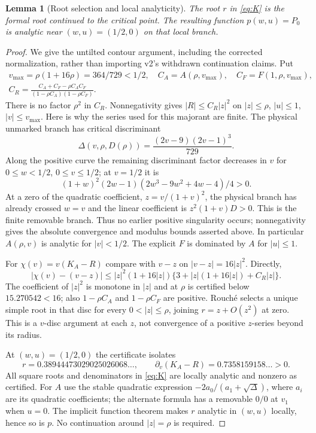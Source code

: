 \documentclass[11pt]{amsart}
\numberwithin{equation}{section}
\newtheorem{lemma}[theorem]{Lemma}
\theoremstyle{remark}\newtheorem{remark}[theorem]{Remark}
\begin{document}
\begin{lemma}[Root selection and local analyticity]\label{lem:analytic}
The root $r$ in \eqref{eq:K} is the formal root continued to the critical point. The resulting function $p(w,u)=P_0$ is analytic near $(w,u)=(1/2,0)$ on that local branch.
\end{lemma}
\begin{proof}
We give the untilted contour argument, including the corrected normalization, rather than importing v2's withdrawn continuation claims. Put
\begin{gather*}
 v_{\max}=\rho(1+16\rho)=364/729<1/2,\quad
 C_A=A(\rho,v_{\max}),\quad C_F=F(1,\rho,v_{\max}),\\
 C_R=\frac{C_A+C_F-\rho C_AC_F}{(1-\rho C_A)(1-\rho C_F)}.
\end{gather*}
There is no factor $\rho^2$ in $C_R$. Nonnegativity gives
$|R|\leq C_R|z|^2$ on $|z|\leq\rho$, $|u|\leq1$, $|v|\leq v_{\max}$.
Here is why the series used for this majorant are finite. The physical unmarked branch has critical discriminant
\[
 \Delta(v,\rho,D(\rho))=\frac{(2v-9)(2v-1)^3}{729}.
\]
Along the positive curve the remaining discriminant factor decreases in $v$ for $0\leq w<1/2$, $0\leq v\leq1/2$; at $v=1/2$ it is
\[
 (1+w)^2(2w-1)(2w^3-9w^2+4w-4)/4>0.
\]
At a zero of the quadratic coefficient, $z=v/(1+v)^2$, the physical branch has already crossed $w=v$ and the linear coefficient is $z^2(1+v)D>0$. This is the finite removable branch. Thus no earlier positive singularity occurs; nonnegativity gives the absolute convergence and modulus bounds asserted above. In particular $A(\rho,v)$ is analytic for $|v|<1/2$. The explicit $F$ is dominated by $A$ for $|u|\leq1$.

For $\chi(v)=v(K_A-R)$ compare with $v-z$ on $|v-z|=16|z|^2$. Directly,
\[
 |\chi(v)-(v-z)|\leq |z|^2(1+16|z|)
              \{3+|z|(1+16|z|)+C_R|z|\}.
\]
The coefficient of $|z|^2$ is monotone in $|z|$ and at $\rho$ is certified below $15.270542<16$; also $1-\rho C_A$ and $1-\rho C_F$ are positive. Rouch\'e selects a unique simple root in that disc for every $0<|z|\leq\rho$, joining $r=z+O(z^2)$ at zero. This is a $v$-disc argument at each $z$, not convergence of a positive $z$-series beyond its radius.

At $(w,u)=(1/2,0)$ the certificate isolates
\[
 r=0.38944473029025026068\ldots,\qquad
 \partial_v(K_A-R)=0.7358159158\ldots>0.
\]
All square roots and denominators in \eqref{eq:K} are locally analytic and nonzero as certified. For $A$ use the stable quadratic expression $-2a_0/(a_1+\sqrt\Delta)$, where $a_i$ are its quadratic coefficients; the alternate formula has a removable $0/0$ at $v_1$ when $u=0$. The implicit function theorem makes $r$ analytic in $(w,u)$ locally, hence so is $p$. No continuation around $|z|=\rho$ is required.
\end{proof}
\end{document}
